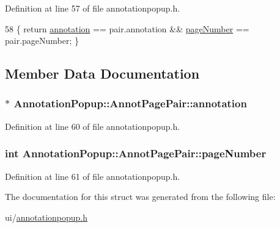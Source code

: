 Definition at line 57 of file annotationpopup.\+h.


\begin{DoxyCode}
58             \{ \textcolor{keywordflow}{return} \hyperlink{structAnnotationPopup_1_1AnnotPagePair_abd389ae75ec90cfcaabce2e79273af3c}{annotation} == pair.annotation && \hyperlink{structAnnotationPopup_1_1AnnotPagePair_abd8fe2b8ae303985a9a08784c6069d29}{pageNumber} == pair.pageNumber; \}
\end{DoxyCode}


\subsection{Member Data Documentation}
\hypertarget{structAnnotationPopup_1_1AnnotPagePair_abd389ae75ec90cfcaabce2e79273af3c}{
\subsubsection[{annotation}]{$\ast$ Annotation\+Popup\+::\+Annot\+Page\+Pair\+::annotation}}\label{structAnnotationPopup_1_1AnnotPagePair_abd389ae75ec90cfcaabce2e79273af3c}


Definition at line 60 of file annotationpopup.\+h.

\hypertarget{structAnnotationPopup_1_1AnnotPagePair_abd8fe2b8ae303985a9a08784c6069d29}{
\subsubsection[{page\+Number}]{\setlength{\rightskip}{0pt plus 5cm}int Annotation\+Popup\+::\+Annot\+Page\+Pair\+::page\+Number}}\label{structAnnotationPopup_1_1AnnotPagePair_abd8fe2b8ae303985a9a08784c6069d29}


Definition at line 61 of file annotationpopup.\+h.



The documentation for this struct was generated from the following file\+:\begin{DoxyCompactItemize}
\item 
ui/\hyperlink{annotationpopup_8h}{annotationpopup.\+h}\end{DoxyCompactItemize}
